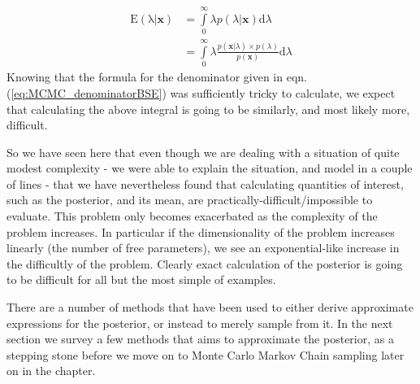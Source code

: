 \documentclass[11pt,fullpage]{book}
\begin{document}
%
\begin{align}
\mathrm{E(\lambda|\boldsymbol{x})} &= \int\limits_{0}^{\infty} \lambda p(\lambda|\boldsymbol{x}) \mathrm{d}\lambda\\
&= \int\limits_{0}^{\infty} \lambda \frac{p(\boldsymbol{x}|\lambda)\times p(\lambda)}{p(\boldsymbol{x})} \mathrm{d}\lambda
\end{align}
%
Knowing that the formula for the denominator given in eqn. (\ref{eq:MCMC_denominatorBSE}) was sufficiently tricky to calculate, we expect that calculating the above integral is going to be similarly, and most likely more, difficult. 

So we have seen here that even though we are dealing with a situation of quite modest complexity - we were able to explain the situation, and model in a couple of lines - that we have nevertheless found that calculating quantities of interest, such as the posterior, and its mean, are practically-difficult/impossible to evaluate. This problem only becomes exacerbated as the complexity of the problem increases. In particular if the dimensionality of the problem increases linearly (the number of free parameters), we see an exponential-like increase in the difficultly of the problem. Clearly exact calculation of the posterior is going to be difficult for all but the most simple of examples.

There are a number of methods that have been used to either derive approximate expressions for the posterior, or instead to merely sample from it. In the next section we survey a few methods that aims to approximate the posterior, as a stepping stone before we move on to Monte Carlo Markov Chain sampling later on in the chapter.
\end{document}
